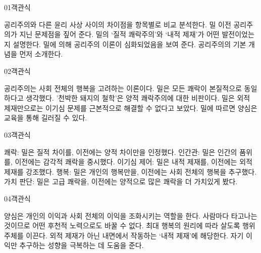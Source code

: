 \documentclass[fs9,seriesRus]{korfarm-base}
\begin{document}
\par\medskip
\kfBeginMC
\begin{kfQBlock}{01}{객관식}
\begin{kfChoices}
\kfChoice 공리주의와 다른 윤리 사상 사이의 차이점을 항목별로 비교 분석한다.
\kfChoice 밀 이전 공리주의가 지닌 문제점을 짚어 준다.
\kfChoice 밀의 ‘질적 쾌락주의’와 ‘내적 제재’가 어떤 발전이었는지 설명한다.
\kfChoice 밀에 의해 공리주의 이론이 심화되었음을 보여 준다.
\kfChoice 공리주의의 기본 개념을 먼저 소개한다.
\end{kfChoices}
\end{kfQBlock}
\begin{kfQBlock}{02}{객관식}
\begin{kfChoices}
\kfChoice 공리주의는 사회 전체의 행복을 고려하는 이론이다.
\kfChoice 밀은 모든 쾌락이 본질적으로 동일하다고 생각했다.
\kfChoice '천박한 돼지의 철학'은 양적 쾌락주의에 대한 비판이다.
\kfChoice 밀은 외적 제재만으로는 이기심 문제를 근본적으로 해결할 수 없다고 보았다.
\kfChoice 밀에 따르면 양심은 교육을 통해 길러질 수 있다.
\end{kfChoices}
\end{kfQBlock}
\begin{kfQBlock}{03}{객관식}
\begin{kfChoices}
\kfChoice 쾌락: 밀은 질적 차이를, 이전에는 양적 차이만을 인정했다.
\kfChoice 인간관: 밀은 인간의 품위를, 이전에는 감각적 쾌락을 중시했다.
\kfChoice 이기심 제어: 밀은 내적 제재를, 이전에는 외적 제재를 강조했다.
\kfChoice 행복: 밀은 개인의 행복만을, 이전에는 사회 전체의 행복을 추구했다.
\kfChoice 가치 판단: 밀은 고급 쾌락을, 이전에는 양적으로 많은 쾌락을 더 가치있게 봤다.
\end{kfChoices}
\end{kfQBlock}
\begin{kfQBlock}{04}{객관식}
\begin{kfChoices}
\kfChoice 양심은 개인의 이익과 사회 전체의 이익을 조화시키는 역할을 한다.
\kfChoice 사람마다 타고나는 것이므로 어떤 후천적 노력으로도 바꿀 수 없다.
\kfChoice 최대 행복의 원리에 따라 살도록 행위 주체를 이끈다.
\kfChoice 외적 제재가 아닌 내면에서 작동하는 ‘내적 제재’에 해당한다.
\kfChoice 자기 이익만 추구하는 성향을 극복하는 데 도움을 준다.
\end{kfChoices}
\end{kfQBlock}
\end{document}
